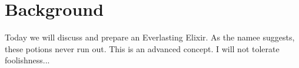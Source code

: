 \section{Background}
\label{sec:background}

Today we will discuss and prepare an Everlasting Elixir. As the namee suggests, these potions never run out. This is an advanced concept. I will not tolerate foolishness...

